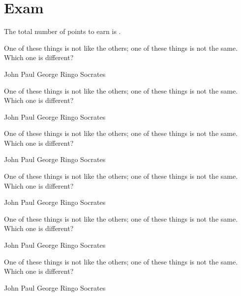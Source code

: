 \documentclass[answers,addpoints]{exam}
\begin{document}
\section*{Exam}
The total number of points to earn is \numpoints.

\hrulefill


\begin{questions}




\question[5]
One of these things is not like the others; one of these
things is not the same. Which one is different?

\begin{randomizechoices}
\choice John
\choice Paul
\choice George
\choice Ringo
\CorrectChoice Socrates
\end{randomizechoices}

\question[5]
One of these things is not like the others; one of these
things is not the same. Which one is different?

\begin{randomizeoneparchoices}
\choice John
\choice Paul
\choice George
\choice Ringo
\CorrectChoice Socrates
\end{randomizeoneparchoices}

\question[5]
One of these things is not like the others; one of these
things is not the same. Which one is different?

\begin{randomizecheckboxes}
\choice John
\choice Paul
\choice George
\choice Ringo
\CorrectChoice Socrates
\end{randomizecheckboxes}

\question[5]
One of these things is not like the others; one of these
things is not the same. Which one is different?

\begin{randomizeoneparcheckboxes}
\choice John
\choice Paul
\choice George
\choice Ringo
\CorrectChoice Socrates
\end{randomizeoneparcheckboxes}

\question[5]
One of these things is not like the others; one of these
things is not the same. Which one is different?

\begin{randomizecheckboxes}
\choice John
\choice Paul
\choice George
\choice Ringo
\CorrectChoice Socrates
\end{randomizecheckboxes}

\question[5]
One of these things is not like the others; one of these
things is not the same. Which one is different?
\begin{randomizeoneparcheckboxes}[nokeeplast]
\choice John
\choice Paul
\choice George
\choice Ringo
\CorrectChoice Socrates
\end{randomizeoneparcheckboxes}


\end{questions}
\end{document}

